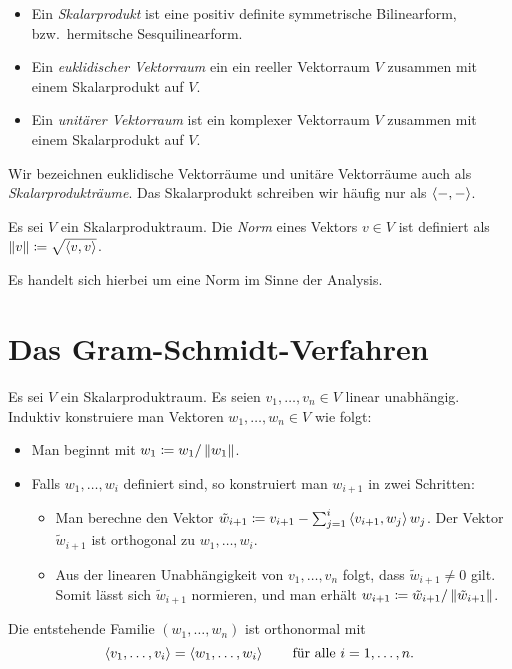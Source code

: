 \begin{definition}
  \begin{itemize}
    \item
      Ein \emph{Skalarprodukt} ist eine positiv definite symmetrische Bilinearform, bzw.\ hermitsche Sesquilinearform.
    \item
      Ein \emph{euklidischer Vektorraum} ein ein reeller Vektorraum $V$ zusammen mit einem Skalarprodukt auf $V$.
    \item
      Ein \emph{unitärer Vektorraum} ist ein komplexer Vektorraum $V$ zusammen mit einem Skalarprodukt auf $V$.
  \end{itemize}
  Wir bezeichnen euklidische Vektorräume und unitäre Vektorräume auch als \emph{Skalarprodukträume}.
  Das Skalarprodukt schreiben wir häufig nur als $\left\langle -, - \right\rangle$.
\end{definition}


\begin{definition}
  Es sei $V$ ein Skalarproduktraum.
  Die \emph{Norm} eines Vektors $v \in V$ ist definiert als $\left\| v \right\| \coloneqq \sqrt{ \left\langle v, v \right\rangle }$.
\end{definition}

\begin{remark}
  Es handelt sich hierbei um eine Norm im Sinne der Analysis.
\end{remark}






\section{Das Gram-Schmidt-Verfahren}

Es sei $V$ ein Skalarproduktraum.
Es seien $v_1, \dotsc, v_n \in V$ linear unabhängig.
Induktiv konstruiere man Vektoren $w_1, \dotsc, w_n \in V$ wie folgt:
\begin{itemize}
  \item
    Man beginnt mit $w_1 \coloneqq w_1 / \left\| w_1 \right\|$.
  \item
    Falls $w_1, \dotsc, w_i$ definiert sind, so konstruiert man $w_{i+1}$ in zwei Schritten:
    \begin{itemize}
      \item
        Man berechne den Vektor $\tilde{w}_{i+1} \coloneqq v_{i+1} - \sum_{j=1}^i \left\langle v_{i+1}, w_j \right\rangle w_j$.
        Der Vektor $\tilde{w}_{i+1}$ ist orthogonal zu $w_1, \dotsc, w_i$.
      \item
        Aus der linearen Unabhängigkeit von $v_1, \dotsc, v_n$ folgt, dass $\tilde{w}_{i+1} \neq 0$ gilt.
        Somit lässt sich $\tilde{w}_{i+1}$ normieren, und man erhält $w_{i+1} \coloneqq \tilde{w}_{i+1} / \left\| \tilde{w}_{i+1} \right\|$.
    \end{itemize}
\end{itemize}
Die entstehende Familie $(w_1, \dotsc, w_n)$ ist orthonormal mit
\[
    \left\langle v_1, \dotsc, v_i \right\rangle
  = \left\langle w_1, \dotsc, w_i \right\rangle
  \qquad
  \text{für alle $i = 1, \dotsc, n$}.
\]

